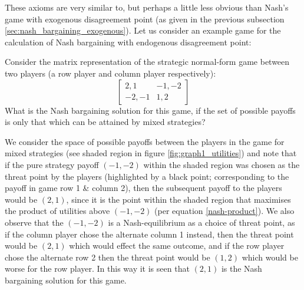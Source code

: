 These axioms are very similar to, but perhaps a little less obvious than Nash's game with exogenous disagreement point (as given in the previous subsection \ref{sec:nash_bargaining_exogenous}).
Let us consider an example game for the calculation of Nash bargaining with endogenous disagreement point:

\begin{example}
Consider the matrix representation of the strategic normal-form game between two players (a row player and column player respectively):
\begin{equation}\label{eq:example_game1} \begin{bmatrix}2,1 & -1,-2\\ -2,-1 & 1,2\end{bmatrix} \end{equation}
What is the Nash bargaining solution for this game, if the set of possible payoffs is only that which can be attained by mixed strategies?\end{example}
\begin{solution}
We consider the space of possible payoffs between the players in the game for mixed strategies (see shaded region in figure \ref{fig:graph1_utilities})
and note that if the pure strategy payoff $(-1,-2)$ within the shaded region was chosen as the threat point by the players (highlighted by a black point; corresponding to the payoff in game row 1 \& column 2), then the subsequent payoff to the players would be $(2,1)$, since it is the point within the shaded region that maximises the product of utilities above $(-1,-2)$ (per equation \ref{nash-product}).
We also observe that the $(-1,-2)$ is a Nash-equilibrium as a choice of threat point, as if the column player chose the alternate column 1 instead, then the threat point would be $(2,1)$ which would effect the same outcome, and if the row player chose the alternate row 2 then the threat point would be $(1,2)$ which would be worse for the row player.
In this way it is seen that $(2,1)$ is the Nash bargaining solution for this game.
\end{solution}
\vspace{2mm}



